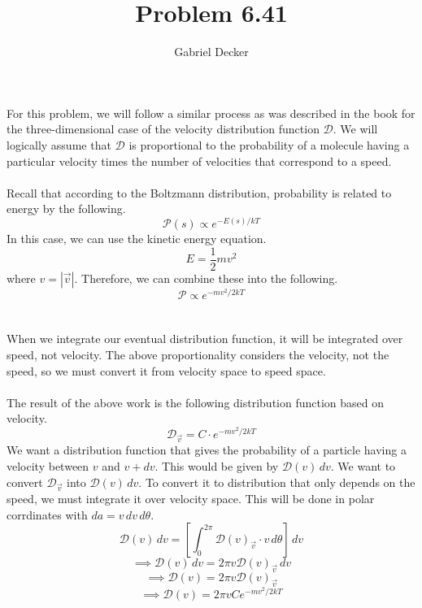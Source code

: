 \documentclass[12pt]{article}
\title{Problem 6.41}
\author{Gabriel Decker}
\begin{document}
\maketitle
\begin{flushleft}


For this problem, we will follow a similar process as was described in the book for the three-dimensional case of the velocity distribution function $\mathcal{D}$.
We will logically assume that $\mathcal{D}$ is proportional to the probability of a molecule having a particular velocity times the number of velocities that correspond to a speed.\\~\\

Recall that according to the Boltzmann distribution, probability is related to energy by the following.
\begin{equation}
    \mathcal{P}(s)\propto e^{-E(s)/kT}
\end{equation}
In this case, we can use the kinetic energy equation.
\begin{equation}
    E=\frac{1}{2}mv^2
\end{equation}
where $v=|\vec{v}|$.
Therefore, we can combine these into the following.
\begin{equation}
    \mathcal{P}\propto e^{-mv^2/2kT}
\end{equation}\\~\\

When we integrate our eventual distribution function, it will be integrated over speed, not velocity.
The above proportionality considers the velocity, not the speed, so we must convert it from velocity space to speed space.\\~\\

The result of the above work is the following distribution function based on velocity.
\begin{equation}
    \mathcal{D}_{\vec{v}}=C\cdot e^{-mv^2/2kT}
\end{equation}
We want a distribution function that gives the probability of a particle having a velocity between $v$ and $v+dv$.
This would be given by $\mathcal{D}(v)\,dv$.
We want to convert $\mathcal{D}_{\vec{v}}$ into $\mathcal{D}(v)\,dv$.
To convert it to distribution that only depends on the speed, we must integrate it over velocity space.
This will be done in polar corrdinates with $da=v\,dv\,d\theta$.
$$\mathcal{D}(v)\,dv=\left[\int_0^{2\pi}\mathcal{D}(v)_{\vec{v}}\cdot v\,d\theta\right]\,dv$$
$$\implies\mathcal{D}(v)\,dv=2\pi v\mathcal{D}(v)_{\vec{v}}\,dv$$
$$\implies\mathcal{D}(v)=2\pi v\mathcal{D}(v)_{\vec{v}}$$
$$\implies\mathcal{D}(v)=2\pi vCe^{-mv^2/2kT}$$\\~\\


\end{flushleft}
\end{document}
